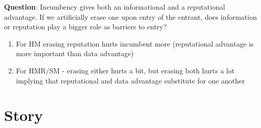 \documentclass[11pt,letterpaper]{article}
\begin{document}
\textbf{Question}: Incumbency gives both an informational and a reputational advantage. If we artificially erase one upon entry of the entrant, does information or reputation play a bigger role as barriers to entry?

\begin{enumerate}
\item For HM erasing reputation hurts incumbent more (reputational advantage is more important than data advantage)
\item For HMR/SM - erasing either hurts a bit, but erasing both hurts a lot implying that reputational and data advantage substitute for one another
\end{enumerate}

\section*{Story}
\end{document}
